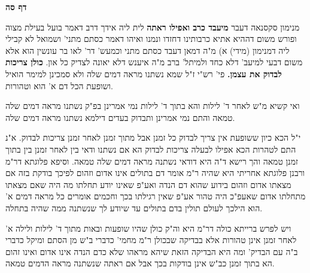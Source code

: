 \documentclass[12pt, openany]{book}
\newcommand{\sethebfont}{
\fontsize{10.5pt}{21.0pt} \selectfont
}
\newcommand{\twocol}[1]{
	{\sethebfont \begin{multicols}{2}
			#1
	\end{multicols}}	
}
\newcommand{\sectname}{}
\newcommand{\newsection}[1]{
	\addcontentsline{toc}{section}{#1}
	\renewcommand{\sectname}{#1}	
	\vspace{-\baselineskip}
	\begin{center}
		\textbf{%
\fontsize{16pt}{16pt}\selectfont
			#1}
	\end{center}
	\vspace{-\baselineskip}
	\nopagebreak
}
\begin{document}
\newsection{דף סה}
\twocol{
 מנימון סקסנאה דעבר \textbf{מיעבד כרב ואפילו ראתה}  לית ליה אידך דרב דאמר בועל בעילת מצוה ופורש משום דההיא אתיא כרבותינו דחזדו ונמנו ואיהו דאמר כסתם מתני' ושמואל לא קבילי ליה דמנימון (מידי) א) מ"ה דמאן דעבד כסתם מתני וכמעש' דר' לאו בר עונשין הוא אלא משום דבעי למיעב' דלא כחד ולמיתל' ברב מ"ה איענש דלא יאונה לצדיק כל און. 
\textbf{כולן צריכות לבדוק את עצמן.}  פי' רש"י ז"ל שמא נשתנו מראה דמים שלה ולא סמכינן למימר הואיל ושופעת הכל דם א' הוא וטהורות.\par ואי קשיא מ"ש לאחר ד' לילות והא בתוך ד' לילות נמי אמרינן בפ"ק נשתנו מראה דמים שלה טמאה והתם נמי אמרינן ותבדוק בעדים דילמא נשתנו מראה דמים שלה.\par  י"ל הכא כיון ששופעת אין צריך לבדוק כל זמנן אבל מתוך זמנן לאחר זמנן צריכות לבדוק. א"נ התם לטהרות הכא אפילו לבעלה צריכות לבדוק הא אם נשתנו ודאי בין לאחר זמנן בין בתוך זמנן טמאה והך רישא ד"ה היא דודאי נשתנה מראה דמים שלה טמאה. וסיפא פלוגתא דר"מ ורבנן פלוגתא אחריתי היא שהיה ר"מ אומר דם בתולים אינו אדום וזהום לפיכך בודקת בזה אם מצאתו אדום וזהום בידוע שהוא דם הנדה ואע"פ שאינו יודע תחלתו מה היה שאם מצאתו מתחלתו אדום שאעפ"כ היה טהור אע"פ שאין רגילתו בכך וחכמים אומרים כל מראה דמים א' הוא הילכך לעולם תולין בדם בתולים עד שיודע לך שנשתנה ממה שהיה בתחלה.\par ויש לפרש ברייתא כולה דר"מ היא וה"ק כולן שהיו שופעות ובאות מתוך ד' לילות ולילה א' לאחר זמנן אינן טהורות אלא בבדיקה שבכולן ר"מ מחמי' כדברי ב"ש מן הסתם ומיקל כדברי ב"ה עם הבדיק' ומה היא הבדיקה הזאת שיהא מראהו שלא כדם הנדה אינו אדום ואינו זהום הא בתוך זמנן כב"ש אינן בודקות בכך אבל אם ראתה שנשתנה מראה הדמים טמאה. }
\end{document}
